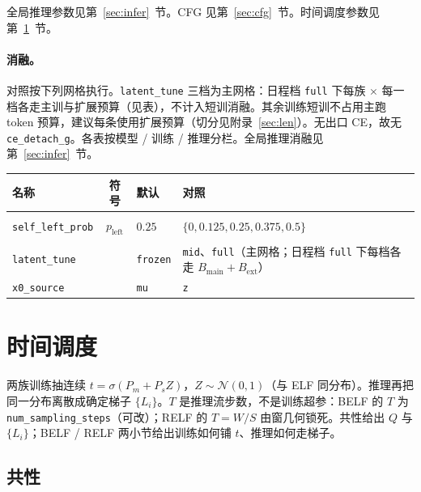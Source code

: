 \documentclass[UTF8,a4paper,11pt]{ctexart}
\begin{document}
全局推理参数见第~\ref{sec:infer}~节。CFG 见第~\ref{sec:cfg}~节。时间调度参数见第~\ref{sec:time}~节。

\paragraph{消融。}
对照按下列网格执行。\texttt{latent\_tune} 三档为主网格：日程档 \texttt{full} 下每族 \(\times\) 每一档各走主训与扩展预算（见表），不计入短训消融。其余训练短训不占用主跑 token 预算，建议每条使用扩展预算（切分见附录~\ref{sec:len}）。无出口 CE，故无 \texttt{ce\_detach\_g}。各表按模型 / 训练 / 推理分栏。全局推理消融见第~\ref{sec:infer}~节。

{\small
\setlength{\tabcolsep}{4pt}
\begin{center}
\begin{tabularx}{\textwidth}{@{}
  >{\raggedright\arraybackslash}p{}
  c
  >{\raggedright\arraybackslash}p{}
  >{\raggedright\arraybackslash}X
  @{}}
\toprule
名称 & 符号 & 默认 & 对照 \\
\midrule
\multicolumn{4}{@{}l}{\textit{模型}} \\
\texttt{self\_left\_prob} & \(p_{\mathrm{left}}\) & \(0.25\) & \(\{0,0.125,0.25,0.375,0.5\}\) \\
\midrule
\multicolumn{4}{@{}l}{\textit{训练}} \\
\texttt{latent\_tune} & & \texttt{frozen} & \texttt{mid}、\texttt{full}（主网格；日程档 \texttt{full} 下每档各走 \(B_{\mathrm{main}}+B_{\mathrm{ext}}\)） \\
\texttt{x0\_source} & & \texttt{mu} & \texttt{z} \\
\bottomrule
\end{tabularx}
\end{center}
}


\section{时间调度}
\label{sec:time}

两族训练抽连续 \(t=\sigma(P_m+P_s Z)\)，\(Z\sim\mathcal{N}(0,1)\)（与 ELF 同分布）。推理再把同一分布离散成确定梯子 \(\{L_i\}\)。\(T\) 是推理流步数，不是训练超参：BELF 的 \(T\) 为 \texttt{num\_sampling\_steps}（可改）；RELF 的 \(T=W/S\) 由窗几何锁死。共性给出 \(Q\) 与 \(\{L_i\}\)；BELF / RELF 两小节给出训练如何铺 \(t\)、推理如何走梯子。

\subsection{共性}
\end{document}
